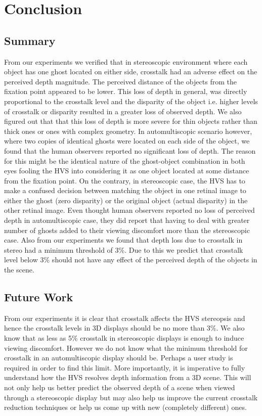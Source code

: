\chapter{Conclusion}

\section{Summary}

From our experiments we verified that in stereoscopic environment where each object has one ghost located on either side, crosstalk had an adverse effect on the perceived depth magnitude. The perceived distance of the objects from the fixation point appeared to be lower. This loss of depth in general, was directly proportional to the crosstalk level and the disparity of the object i.e. higher levels of crosstalk or disparity resulted in a greater loss of observed depth. We also figured out that that this loss of depth is more severe for thin objects rather than thick ones or ones with complex geometry. In automultiscopic scenario however, where two copies of identical ghosts were located on each side of the object, we found that the human observers reported no significant loss of depth. The reason for this might be the identical nature of the ghost-object combination in both eyes fooling the HVS into considering it as one object located at some distance from the fixation point. On the contrary, in stereoscopic case, the HVS has to make a confused decision between matching the object in one retinal image to either the ghost (zero disparity) or the original object (actual disparity) in the other retinal image. Even thought human observers reported no loss of perceived depth in automultiscopic case, they did report that having to deal with greater number of ghosts added to their viewing discomfort more than the stereoscopic case. Also from our experiments we found that depth loss due to crosstalk in stereo had a minimum threshold of 3\%. Due to this we predict that crosstalk level below 3\% should not have any effect of the perceived depth of the objects in the scene.
\pagebreak
\section{Future Work}

From our experiments it is clear that crosstalk affects the HVS stereopsis and hence the crosstalk levels in 3D displays should be no more than 3\%. We also know that as less as 5\% crosstalk in stereoscopic displays is enough to induce viewing discomfort. However we do not know what the minimum threshold for crosstalk in an automultiscopic display should be. Perhaps a user study is required in order to find this limit. More importantly, it is imperative to fully understand how the HVS resolves depth information from a 3D scene. This will not only help us better predict the observed depth of a scene when viewed through a stereoscopic display but may also help us improve the current crosstalk reduction techniques or help us come up with new (completely different) ones.

